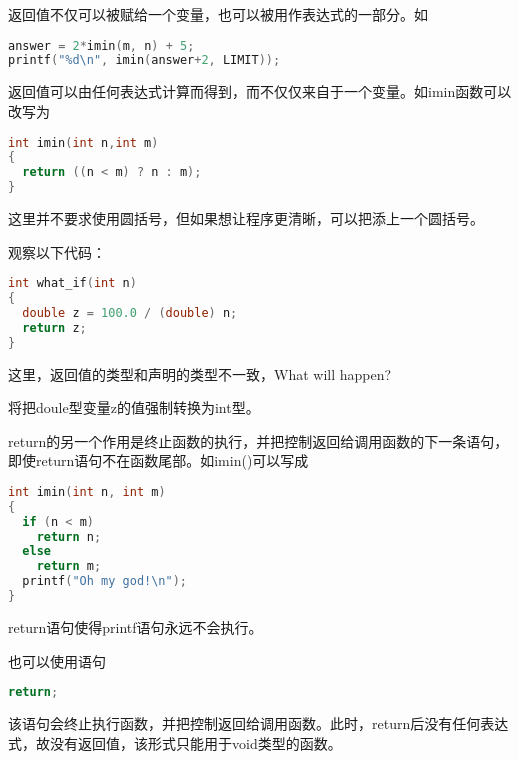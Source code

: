 \begin{frame}[fragile]
返回值不仅可以被赋给一个变量，也可以被用作表达式的一部分。如
\begin{lstlisting}[language=c,backgroundcolor=\color{red!10}]
answer = 2*imin(m, n) + 5;
printf("%d\n", imin(answer+2, LIMIT));
\end{lstlisting}

\end{frame}

\begin{frame}[fragile]
返回值可以由任何表达式计算而得到，而不仅仅来自于一个变量。如imin函数可以改写为
\begin{lstlisting}[language=c,backgroundcolor=\color{red!10}]
int imin(int n,int m)
{  
  return ((n < m) ? n : m);
}
\end{lstlisting}
这里并不要求使用圆括号，但如果想让程序更清晰，可以把添上一个圆括号。
\end{frame}

\begin{frame}[fragile]
观察以下代码：
\begin{lstlisting}[language=c,backgroundcolor=\color{red!10}]
int what_if(int n)
{  
  double z = 100.0 / (double) n;
  return z;
}
\end{lstlisting}
这里，返回值的类型和声明的类型不一致，{\Large What will happen?}
\pause 
\vspace{0.1in}

\textcolor{acolor1}{将把{\tf doule}型变量{\tf z}的值强制转换为{\tf int}型。}

\end{frame}

\begin{frame}[fragile]
{\tf return}的另一个作用是终止函数的执行，并把控制返回给调用函数的下一条语句，即使{\tf return}语句不在函数尾部。如{\tf imin()}可以写成
\begin{lstlisting}[language=c,backgroundcolor=\color{red!10}]
int imin(int n, int m)
{  
  if (n < m)
    return n;
  else
    return m;  
  printf("Oh my god!\n");    
}
\end{lstlisting}
{\tf return}语句使得{\tf printf}语句永远不会执行。
\end{frame}

\begin{frame}[fragile]
也可以使用语句
\begin{lstlisting}[language=c,backgroundcolor=\color{red!10}]
return;
\end{lstlisting}
该语句会终止执行函数，并把控制返回给调用函数。此时，{\tf return}后没有任何表达式，故没有返回值，该形式只能用于{\tf void}类型的函数。
\end{frame}

